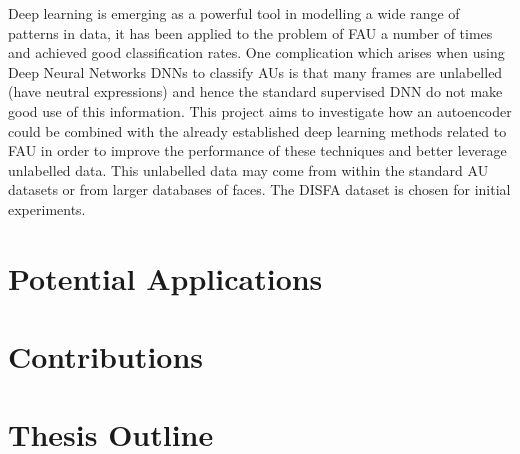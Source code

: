     Deep learning is emerging as a powerful tool in modelling a wide range of patterns
    in data, it has been applied to the problem of FAU a number of times and achieved
    good classification rates. One complication which arises when using Deep Neural
    Networks DNNs to classify AUs is that many frames are unlabelled (have neutral expressions)
    and hence the standard supervised DNN do not make good use of this information.
    This project aims to investigate how an autoencoder could be combined with the
    already established deep learning methods related to FAU in order to improve the performance
    of these techniques and better leverage unlabelled data. This unlabelled data may
    come from within the standard AU datasets or from larger databases of faces.
    The DISFA dataset is chosen for initial experiments.
  \section{Potential Applications}
  \section{Contributions}
  \section{Thesis Outline}
